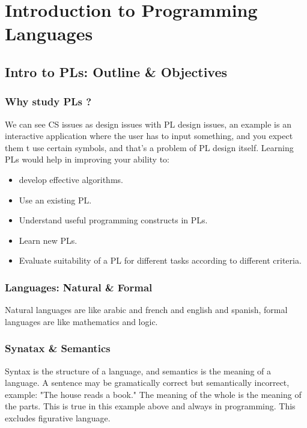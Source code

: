 \chapter{Introduction to Programming Languages}

    
     \section{Intro to PLs: Outline \& Objectives}
     \subsection{Why study PLs ?}
        We can see CS issues as design issues with PL design issues, an example is an interactive application where the user has to input something, and you expect them t use certain symbols, and that's a problem of PL design itself.
        Learning PLs would help in improving your ability to:
        \begin{itemize}
            \item develop effective algorithms.
            \item Use an existing PL.
            \item Understand useful programming constructs in PLs.
            \item Learn new PLs.
            \item Evaluate suitability of a PL for different tasks according to different criteria.
        \end{itemize}

     \subsection{Languages: Natural \& Formal}
        Natural languages are like arabic and french and english and spanish, formal languages are like mathematics and logic.
     \subsection{Synatax \& Semantics}
        Syntax is the structure of a language, and semantics is the meaning of a language.
        A sentence may be gramatically correct but semantically incorrect, example: "The house reads a book."
        The meaning of the whole is the meaning of the parts. This is true in this example above and always in programming. This excludes figurative language.

